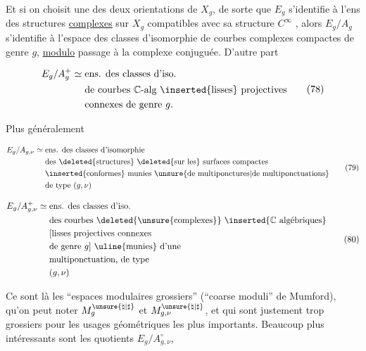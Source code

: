 Et si on choisit une des deux orientations de \(X_g\), de sorte que \(E_g\) s'identifie à l'ens des structures \uline{complexes} sur \(X_g\) compatibles avec sa structure \(C^\infty\) , alors \(E_g/A_g\) s'identifie à l'espace des classes d'isomorphie de courbes complexes  compactes de genre \(g\), \uline{modulo} passage à la complexe conjuguée. D'autre part

\[
 \begin{aligned}
 E_g/A_g^+\simeq{}&\text{ens. des classes d'iso.}\\
 &\text{de courbes }\mathbb C\text{-alg \inserted{lisses} projectives}\\
 &\text{connexes de genre }g.
 \end{aligned}
 \tag{78}
\]

Plus généralement

\[
 \begin{aligned}
 E_g/A_{g,\nu}\simeq{}&\text{ens. des classes d'isomorphie}\\
 &\text{des \deleted{structures} \deleted{sur les} surfaces compactes}\\
 &\text{\inserted{conformes} munies \unsure{de multiponctures|de multiponctuations}}\\
 &\text{de type }(g,\nu)
 \end{aligned}
 \tag{79}
\]

\[
 \begin{aligned}
 E_g/A_{g,\nu}^{+}\simeq{}&\text{ens. des classes d'iso.}\\
 &\text{des courbes \deleted{\unsure{complexes}} \inserted{\(\mathbb C\) algébriques}}\\
 &\text{[lisses projectives connexes}\\
 &\text{de genre }g\text{] \uline{munies} d'une}\\
 &\text{multiponctuation, de type}\\
 &(g,\nu)
 \end{aligned}
 \tag{80}
\]

Ce sont là les ``espaces modulaires grossiers'' (``coarse moduli'' de Mumford), qu'on peut noter \(M_g^{\unsure{\natural|\sharp}}\) et \(M_{g,\nu}^{\unsure{\natural|\sharp}}\), et qui sont justement trop grossiers pour les usages géométriques les plus importants.  Beaucoup plus intéressants sont les quotients \(E_g/A_{g,\nu}^{\circ}\), 

